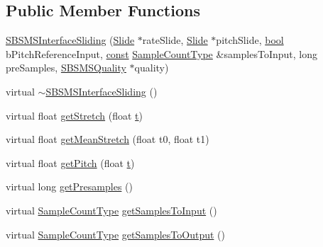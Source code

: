 \subsection*{Public Member Functions}
\begin{DoxyCompactItemize}
\item 
\hyperlink{class__sbsms___1_1_s_b_s_m_s_interface_sliding_a9374be13532379a76d1aa0f738079ce9}{S\+B\+S\+M\+S\+Interface\+Sliding} (\hyperlink{class__sbsms___1_1_slide}{Slide} $\ast$rate\+Slide, \hyperlink{class__sbsms___1_1_slide}{Slide} $\ast$pitch\+Slide, \hyperlink{mac_2config_2i386_2lib-src_2libsoxr_2soxr-config_8h_abb452686968e48b67397da5f97445f5b}{bool} b\+Pitch\+Reference\+Input, \hyperlink{getopt1_8c_a2c212835823e3c54a8ab6d95c652660e}{const} \hyperlink{namespace__sbsms___ae4ba47977e7e07f5945e529e2256b662}{Sample\+Count\+Type} \&samples\+To\+Input, long pre\+Samples, \hyperlink{class__sbsms___1_1_s_b_s_m_s_quality}{S\+B\+S\+M\+S\+Quality} $\ast$quality)
\item 
virtual \hyperlink{class__sbsms___1_1_s_b_s_m_s_interface_sliding_ab6f1665367b817933b583c18345e09f9}{$\sim$\+S\+B\+S\+M\+S\+Interface\+Sliding} ()
\item 
virtual float \hyperlink{class__sbsms___1_1_s_b_s_m_s_interface_sliding_a3149b111891bf449c41a87b3658ecaf1}{get\+Stretch} (float \hyperlink{octave__test_8m_aaccc9105df5383111407fd5b41255e23}{t})
\item 
virtual float \hyperlink{class__sbsms___1_1_s_b_s_m_s_interface_sliding_af58ff74de5caedce1bd53c8076da04a6}{get\+Mean\+Stretch} (float t0, float t1)
\item 
virtual float \hyperlink{class__sbsms___1_1_s_b_s_m_s_interface_sliding_a1ba8f3deec62d6d7966cef0492c8a166}{get\+Pitch} (float \hyperlink{octave__test_8m_aaccc9105df5383111407fd5b41255e23}{t})
\item 
virtual long \hyperlink{class__sbsms___1_1_s_b_s_m_s_interface_sliding_acc571785cde8f8aa6b5df937f1a0fddf}{get\+Presamples} ()
\item 
virtual \hyperlink{namespace__sbsms___ae4ba47977e7e07f5945e529e2256b662}{Sample\+Count\+Type} \hyperlink{class__sbsms___1_1_s_b_s_m_s_interface_sliding_a68bdf23fa4fb8709190f5091898df215}{get\+Samples\+To\+Input} ()
\item 
virtual \hyperlink{namespace__sbsms___ae4ba47977e7e07f5945e529e2256b662}{Sample\+Count\+Type} \hyperlink{class__sbsms___1_1_s_b_s_m_s_interface_sliding_ab4bda022508207d3bf3a2cb358985cb9}{get\+Samples\+To\+Output} ()
\end{DoxyCompactItemize}
